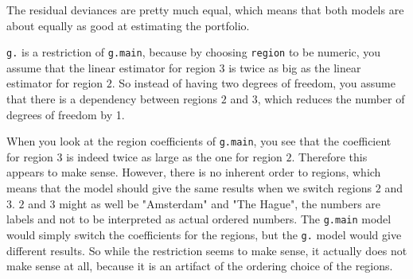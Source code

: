 \documentclass[11pt]{article}
\begin{document}
The residual deviances are pretty much equal, which means that both models are about equally as good at estimating the portfolio.

\verb|g.| is a restriction of \verb|g.main|, because by choosing \verb|region| to be numeric, you assume that the linear estimator for region $3$ is twice as big as the linear estimator for region $2$. So instead of having two degrees of freedom, you assume that there is a dependency between regions $2$ and $3$, which reduces the number of degrees of freedom by 1.

When you look at the region coefficients of \verb|g.main|, you see that the coefficient for region $3$ is indeed twice as large as the one for region $2$. Therefore this appears to make sense. However, there is no inherent order to regions, which means that the model should give the same results when we switch regions $2$ and $3$. $2$ and $3$ might as well be "Amsterdam" and "The Hague", the numbers are labels and not to be interpreted as actual ordered numbers. The \verb|g.main| model would simply switch the coefficients for the regions, but the \verb|g.| model would give different results. So while the restriction seems to make sense, it actually does not make sense at all, because it is an artifact of the ordering choice of the regions.
\end{document}
